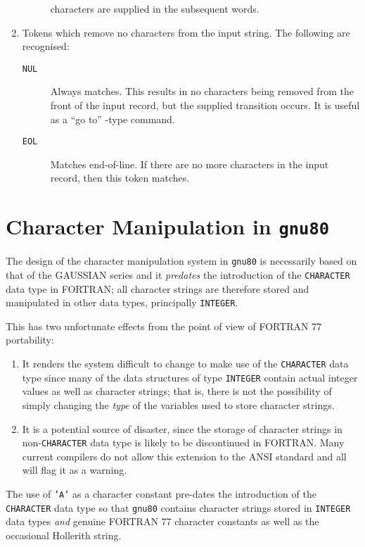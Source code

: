 \begin{enumerate}
\begin{description}
characters are supplied in the subsequent words.
\end{description}
\item Tokens which remove no characters from the input string.
The following are recognised:
\begin{description}
\item[{\tt NUL}]     Always matches. This results in no characters being
removed from the front of the input record, but
the supplied transition occurs. It is useful as a
``go to'' -type command.
\item[{\tt EOL}]         Matches end-of-line. 
If there are no more characters
in the input record, then this token matches.
\end{description}
\end{enumerate}
\section{\sf Character Manipulation in {\tt gnu80}}
The design of the character manipulation system in {\tt gnu80}
is necessarily based on that of the GAUSSIAN series and it
{\em predates} the introduction of the {\tt CHARACTER} data type in
FORTRAN; all character strings are therefore stored and manipulated
in other data types, principally {\tt INTEGER}.

This has two unfortunate effects from the point of view of
FORTRAN 77 portability:
\begin{enumerate}
\item It renders the system difficult to change to make use of
the {\tt CHARACTER} data type since many of the data structures
of type {\tt INTEGER} contain actual integer values as well
as character strings; that is, there is not the possibility of
simply changing the {\em type} of the variables used to store
character strings.
\item It is a potential source of disaster, since the storage of
character strings in non-{\tt CHARACTER} data type is likely to
be discontinued in FORTRAN. Many current compilers do not allow this
extension to the ANSI standard and all will flag it as a warning.
\end{enumerate}
The use of {\tt 'A'} as a character constant pre-dates the introduction
of the {\tt CHARACTER} data type so that {\tt gnu80} contains character strings
stored in {\tt INTEGER} data types {\em and} genuine FORTRAN 77
character constants as well as the occasional
Hollerith string. 

